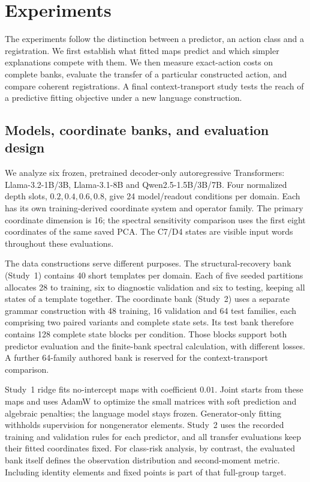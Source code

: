 \section{Experiments}
\label{sec:pending-studies}
\label{sec:evidence}
The experiments follow the distinction between a predictor, an action class and a registration. We first establish what fitted maps predict and which simpler explanations compete with them. We then measure exact-action costs on complete banks, evaluate the transfer of a particular constructed action, and compare coherent registrations. A final context-transport study tests the reach of a predictive fitting objective under a new language construction.

\subsection{Models, coordinate banks, and evaluation design}
\label{sec:design}
We analyze six frozen, pretrained decoder-only autoregressive Transformers: Llama-3.2-1B/3B, Llama-3.1-8B and Qwen2.5-1.5B/3B/7B. Four normalized depth slots, $0.2,0.4,0.6,0.8$, give 24 model/readout conditions per domain. Each has its own training-derived coordinate system and operator family. The primary coordinate dimension is 16; the spectral sensitivity comparison uses the first eight coordinates of the same saved PCA. The C7/D4 states are visible input words throughout these evaluations.

The data constructions serve different purposes. The structural-recovery bank (Study~1) contains 40 short templates per domain. Each of five seeded partitions allocates 28 to training, six to diagnostic validation and six to testing, keeping all states of a template together. The coordinate bank (Study~2) uses a separate grammar construction with 48 training, 16 validation and 64 test families, each comprising two paired variants and complete state sets. Its test bank therefore contains 128 complete state blocks per condition. Those blocks support both predictor evaluation and the finite-bank spectral calculation, with different losses. A further 64-family authored bank is reserved for the context-transport comparison.

\hypertarget{par:estimation}{}
Study~1 ridge fits no-intercept maps with coefficient $0.01$. Joint starts from these maps and uses AdamW to optimize the small matrices with soft prediction and algebraic penalties; the language model stays frozen. Generator-only fitting withholds supervision for nongenerator elements. Study~2 uses the recorded training and validation rules for each predictor, and all transfer evaluations keep their fitted coordinates fixed. For class-risk analysis, by contrast, the evaluated bank itself defines the observation distribution and second-moment metric. Including identity elements and fixed points is part of that full-group target.

